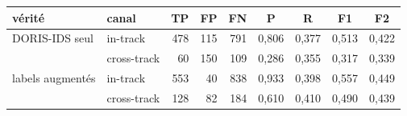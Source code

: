 \begin{tabular}{llrrrcccc}
\toprule
vérité & canal & TP & FP & FN & P & R & F1 & F2 \\
\midrule
DORIS-IDS seul & in-track & 478 & 115 & 791 & 0,806 & 0,377 & 0,513 & 0,422 \\
 & cross-track & 60 & 150 & 109 & 0,286 & 0,355 & 0,317 & 0,339 \\
\midrule
labels augmentés & in-track & 553 & 40 & 838 & 0,933 & 0,398 & 0,557 & 0,449 \\
 & cross-track & 128 & 82 & 184 & 0,610 & 0,410 & 0,490 & 0,439 \\
\bottomrule
\end{tabular}
